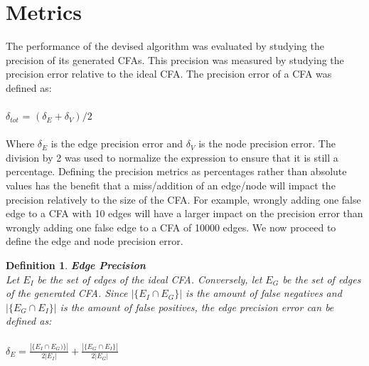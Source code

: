 \documentclass{kththesis}
\newtheorem*{definition}{Definition}
\begin{document}
\section{Metrics}\label{sec:metrics}
The performance of the devised algorithm was evaluated by studying the precision of its generated CFAs. This precision was measured by studying the precision error relative to the ideal CFA. The precision error of a CFA was defined as:
\\ \\
$\delta_{tot}$ = $(\delta_E+\delta_V)/2$
\\ \\
Where $\delta_E$ is the edge precision error and $\delta_V$ is the node precision error. The division by 2 was used to normalize the expression to ensure that it is still a percentage. Defining the precision metrics as percentages rather than absolute values has the benefit that a miss/addition of an edge/node will impact the precision relatively to the size of the CFA. For example, wrongly adding one false edge to a CFA with 10 edges will have a larger impact on the precision error than wrongly adding one false edge to a CFA of 10000 edges. We now proceed to define the edge and node precision error.
\begin{definition} \textbf{Edge Precision}\\
Let $E_I$ be the set of edges of the ideal CFA. Conversely, let $E_G$ be the set of edges of the generated CFA. Since $|\{E_I \cap E_G\}|$ is the amount of false negatives and $|\{E_G \cap E_I\}|$ is the amount of false positives, the edge precision error can be defined as:
\\ \\
$\delta_{E}=\frac{|\{E_I \cap E_G)\}|}{2|E_I|}+\frac{|\{E_G \cap E_I\}|}{2|E_G|}$
\end{definition}
\end{document}
